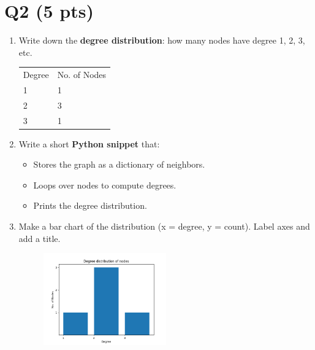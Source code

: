 \documentclass{article}
\begin{document}
\section*{Q2 (5 pts)}

\begin{enumerate}
    \item {
        Write down the \textbf{degree distribution}: how many nodes have degree 1, 2, 3, etc.

        \begin{table}[htbp]
            \centering
            \begin{tabular}{ll}
                Degree & No. of Nodes \\
                1 & 1 \\
                2 & 3 \\
                3 & 1 \\

            \end{tabular}
        \end{table}
    }

    \item {
        Write a short \textbf{Python snippet} that:
        \begin{itemize}
            \item Stores the graph as a dictionary of neighbors.
            \item Loops over nodes to compute degrees.
            \item Prints the degree distribution.
        \end{itemize}

                
    }

    \item {
        Make a bar chart of the distribution (x = degree, y = count). Label axes and add a title.
        \begin{figure}[htbp]
            \centering
            \includegraphics[width=0.5\textwidth]{bar.png}
        \end{figure} 
    }
\end{enumerate}
\end{document}
